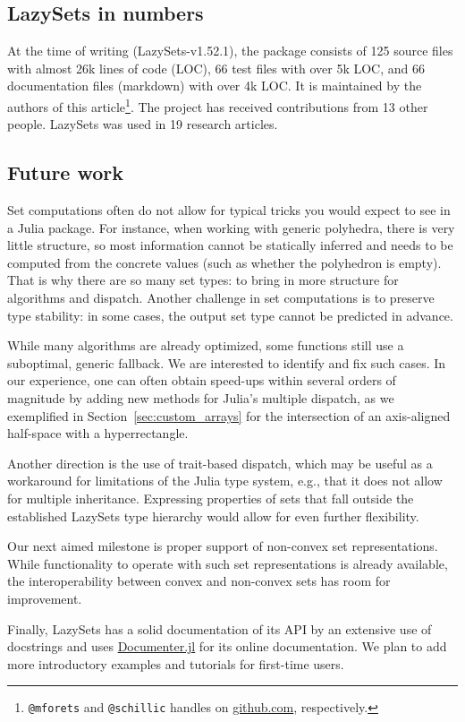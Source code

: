 \subsection{LazySets in numbers}

At the time of writing (LazySets-v1.52.1), the package consists of 125 source files with almost 26k lines of code (LOC), 66 test files with over 5k LOC, and 66 documentation files (markdown) with over 4k LOC.
%
It is maintained by the authors of this article\footnote{\texttt{@mforets} and \texttt{@schillic} handles on \href{https://github.com/}{github.com}, respectively.}.
%
The project has received contributions from 13 other people.
%
LazySets was used in 19 research articles.


\subsection{Future work}

Set computations often do not allow for typical tricks you would expect to see in a Julia package. For instance, when working with generic polyhedra, there is very little structure, so most information cannot be statically inferred and needs to be computed from the concrete values (such as whether the polyhedron is empty). That is why there are so many set types: to bring in more structure for algorithms and dispatch.
%
Another challenge in set computations is to preserve type stability: in some cases, the output set type cannot be predicted in advance.

\smallskip

While many algorithms are already optimized, some functions still use a suboptimal, generic fallback.
%
We are interested to identify and fix such cases.
%
In our experience, one can often obtain speed-ups within several orders of magnitude by adding new methods for Julia's multiple dispatch, as we exemplified in Section~\ref{sec:custom_arrays} for the intersection of an axis-aligned half-space with a hyperrectangle.

\smallskip

Another direction is the use of trait-based dispatch, which may be useful as a workaround for limitations of the Julia type system, e.g., that it does not allow for multiple inheritance.
%
Expressing properties of sets that fall outside the established LazySets type hierarchy would allow for even further flexibility.

\smallskip

Our next aimed milestone is proper support of non-convex set representations. While functionality to operate with such set representations is already available, the interoperability between convex and non-convex sets has room for improvement.

\smallskip

Finally, LazySets has a solid documentation of its API by an extensive use of docstrings and uses \href{https://github.com/JuliaDocs/Documenter.jl}{Documenter.jl} for its online documentation.
%
We plan to add more introductory examples and tutorials for first-time users.
